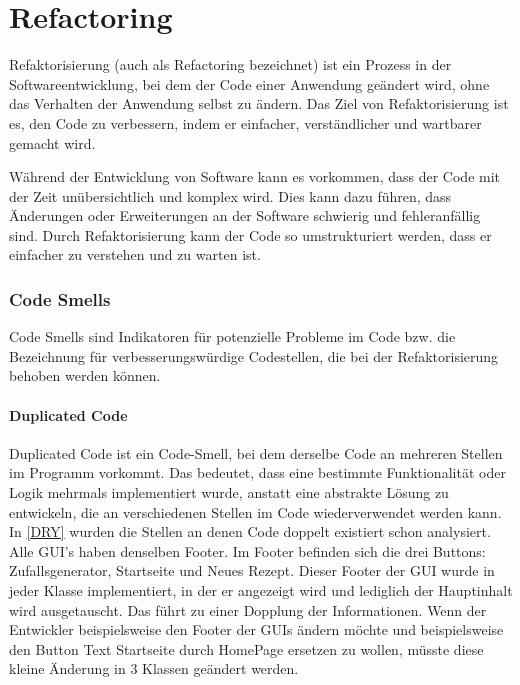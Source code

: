 \chapter{Refactoring}
Refaktorisierung (auch als Refactoring bezeichnet) ist ein Prozess in der Softwareentwicklung, bei dem der Code einer Anwendung geändert wird, ohne das Verhalten der Anwendung selbst zu ändern. Das Ziel von Refaktorisierung ist es, den Code zu verbessern, indem er einfacher, verständlicher und wartbarer gemacht wird.

Während der Entwicklung von Software kann es vorkommen, dass der Code mit der Zeit unübersichtlich und komplex wird. Dies kann dazu führen, dass Änderungen oder Erweiterungen an der Software schwierig und fehleranfällig sind. Durch Refaktorisierung kann der Code so umstrukturiert werden, dass er einfacher zu verstehen und zu warten ist.
\subsection{Code Smells}
Code Smells sind Indikatoren für potenzielle Probleme im Code bzw. die Bezeichnung für verbesserungswürdige Codestellen, die bei der Refaktorisierung behoben werden können. 
\subsubsection{Duplicated Code}
Duplicated Code ist ein Code-Smell, bei dem derselbe Code an mehreren Stellen im Programm vorkommt. Das bedeutet, dass eine bestimmte Funktionalität oder Logik mehrmals implementiert wurde, anstatt eine abstrakte Lösung zu entwickeln, die an verschiedenen Stellen im Code wiederverwendet werden kann. In \autoref{DRY} wurden die Stellen an denen Code doppelt existiert schon analysiert. Alle GUI's haben denselben Footer. Im Footer befinden sich die drei Buttons: Zufallsgenerator, Startseite und Neues Rezept. Dieser Footer der GUI wurde in jeder Klasse implementiert, in der er angezeigt wird und lediglich der Hauptinhalt wird ausgetauscht. Das führt zu einer Dopplung der Informationen. Wenn der Entwickler beispielsweise den Footer der GUIs ändern möchte und beispielsweise den Button Text Startseite durch HomePage ersetzen zu wollen, müsste diese kleine Änderung in 3 Klassen geändert werden. 

